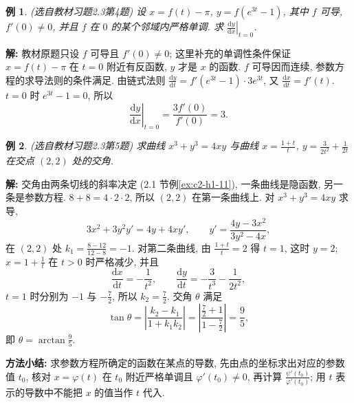 \documentclass[UTF8,openany]{ctexbook}
\theoremstyle{chinesetextbook}
\newtheorem{example}{例}[section]
\newenvironment{cnsolution}{\par\indent\textbf{解:} \ignorespaces}{\par}
\newcommand{\dd}{\mathrm d}
\begin{document}
\begin{example}\label{ex:c2-h3-4}
\textnormal{(选自教材习题2.3第4题)} 设 $x=f(t)-\pi$, $y=f\left(e^{3t}-1\right)$, 其中 $f$ 可导, $f'(0)\ne0$, 并且 $f$ 在 $0$ 的某个邻域内严格单调. 求 $\displaystyle\left.\frac{\dd y}{\dd x}\right|_{t=0}$.
\end{example}
\begin{cnsolution}
教材原题只设 $f$ 可导且 $f'(0)\ne0$; 这里补充的单调性条件保证 $x=f(t)-\pi$ 在 $t=0$ 附近有反函数, $y$ 才是 $x$ 的函数. $f$ 可导因而连续, 参数方程的求导法则的条件满足. 由链式法则 $\displaystyle\frac{\dd y}{\dd t}=f'\left(e^{3t}-1\right)\cdot3e^{3t}$, 又 $\displaystyle\frac{\dd x}{\dd t}=f'(t)$. $t=0$ 时 $e^{3t}-1=0$, 所以
\[
\left.\frac{\dd y}{\dd x}\right|_{t=0}=\frac{3f'(0)}{f'(0)}=3.
\]
\end{cnsolution}
\begin{example}\label{ex:c2-h3-5}
\textnormal{(选自教材习题2.3第5题)} 求曲线 $x^3+y^3=4xy$ 与曲线 $\displaystyle x=\frac{1+t}t$, $\displaystyle y=\frac3{2t^2}+\frac1{2t}$ 在交点 $(2,2)$ 处的交角.
\end{example}
\begin{cnsolution}
交角由两条切线的斜率决定 (2.1 节例\ref{ex:c2-h1-11}), 一条曲线是隐函数, 另一条是参数方程. $8+8=4\cdot2\cdot2$, 所以 $(2,2)$ 在第一条曲线上. 对 $x^3+y^3=4xy$ 求导,
\[
3x^2+3y^2y'=4y+4xy',\qquad y'=\frac{4y-3x^2}{3y^2-4x},
\]
在 $(2,2)$ 处 $\displaystyle k_1=\frac{8-12}{12-8}=-1$. 对第二条曲线, 由 $\displaystyle\frac{1+t}t=2$ 得 $t=1$, 这时 $y=2$; $\displaystyle x=1+\frac1t$ 在 $t>0$ 时严格减少, 并且
\[
\frac{\dd x}{\dd t}=-\frac1{t^2},\qquad\frac{\dd y}{\dd t}=-\frac3{t^3}-\frac1{2t^2},
\]
$t=1$ 时分别为 $-1$ 与 $\displaystyle-\frac72$, 所以 $\displaystyle k_2=\frac72$. 交角 $\theta$ 满足
\[
\tan\theta=\left|\frac{k_2-k_1}{1+k_1k_2}\right|=\left|\frac{\frac72+1}{1-\frac72}\right|=\frac95,
\]
即 $\displaystyle\theta=\arctan\frac95$.
\end{cnsolution}
\par\indent\textbf{方法小结:} 求参数方程所确定的函数在某点的导数, 先由点的坐标求出对应的参数值 $t_0$, 核对 $x=\varphi(t)$ 在 $t_0$ 附近严格单调且 $\varphi'(t_0)\ne0$, 再计算 $\displaystyle\frac{\psi'(t_0)}{\varphi'(t_0)}$; 用 $t$ 表示的导数中不能把 $x$ 的值当作 $t$ 代入.
\end{document}
